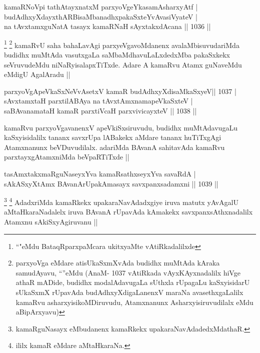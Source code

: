 
\begin{shl}
kamaRNoV\s pi tathA\s tayxnatxM parxyoVgeYkasamAsharxyAtf | \\
budAdhxyXdayxthARBisaMbanadhxpakaSxteYvAvasiVyateV | \\
na tAvxtamxguNatA tasayx kamaRNaH sAyxtakxdAcana \hfill||  1036 ||  
\end{shl}

\begin{artha}
\footnote{``\stext"eMdu BataqRparxpaMcara ukitxyaMte vAtiRkadalilxde}
\footnote{parxyoVga eMdare atisUkaSxmXvAda budidhx muMtAda kAraka samudAyavu, ``\stext''eMdu (AnaM- 1037 vAtiRkada vAyxKAyxnadalilx hiVge athaR mADide, budidhx modalAdavugaLa sUthxla rUpagaLu kaSxyisidarU sUkaSxmX rUpavAda budAdhxyXdigaLanenxV maraNa avasethxgaLalilx kamaRvu asharxyisikoMDiruvudu, Atamxnanunx Asharxyisiruvudilalx eMdu aBipArxyavu)}
kamaRvU saha bahaLavAgi parxyeVgavoMdanenx avalaMbisuvudariMda budidhx muMtAda vasutxgaLa saMbaMdhavuLaLxdedxMba pakaSxkekx seVruvudeMdu niNaRyisalapxTiTxde. Adare A kamaRvu Atamx guNaveMdu eMdigU AgalAradu ||
\end{artha}

\begin{shl}
parxyoVgApeVkaSxNeVvA\s \s setxV kamaR budAdhxyXdisaMkaSxyeV\hfill ||  1037 | \\
sAvxtamxtaH parxtilABAya na tAvxtAmxnamapeVkaSxteV | \\
saBAvanamataH kamaR parxtiVcaH parxvivicayxteV \hfill||  1038 ||  
\end{shl}

\begin{artha}
kamaRvu parxyoVgavanenxV apeVkiSxsiruvudu, budidhx muMtAdavugaLu kaSxyisidalilx tananx savxrUpa lABakekx aMdare tananx huTiTxgAgi Atamxnanunx beVDuvudilalx. adariMda BAvanA sahitavAda kamaRvu parxtayxgAtamxniMda beVpaRTiTxde ||
\end{artha}

\begin{shl}
tasAmxtakxmaRguNaseyxYva kamaRsathxseyxYva savaRdA | \\
sAkASxyXtAmx BAvanArUpakAmasayx savxpanxsadamxni \hfill||  1039 ||  
\end{shl}

\begin{artha}
\footnote{kamaRguNasayx eMbudanenx kamaRkekx upakaraNavAdadedxMdathaR.}
\footnote{ililx kamaR eMdare aMtaHkaraNa.}
AdadxriMda kamaRkekx upakaraNavAdadxgiye iruva matutx yAvAgalU aMtaHkaraNadalelx iruva BAvanA rUpavAda kAmakekx savxpanxsAthxnadalilx Atamxnu sAkiSxyAgiruvanu ||
\end{artha}

